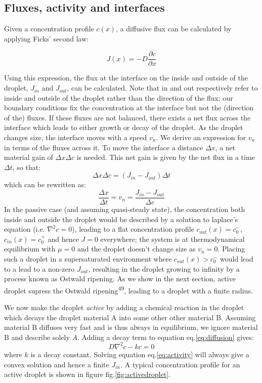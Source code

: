 \documentclass{Dissertate}
\begin{document}
\hypertarget{fluxes-activity-and-interfaces}{%
\subsection{Fluxes, activity and
interfaces}\label{fluxes-activity-and-interfaces}}

Given a concentration profile \(c(x)\), a diffusive flux can be
calculated by applying Ficks' second law:

\[
J(x) = -D\frac{\partial c}{\partial x}
\]

Using this expression, the flux at the interface on the inside and
outside of the droplet, \(J_{in}\) and \(J_{out}\), can be calculated.
Note that in and out respectively refer to inside and outside of the
droplet rather than the direction of the flux; our boundary conditions
fix the concentration at the interface but not the (direction of the)
fluxes. If these fluxes are not balanced, there exists a net flux across
the interface which leads to either growth or decay of the droplet. As
the droplet changes size, the interface moves with a speed \(v_n\). We
derive an expression for \(v_n\) in terms of the fluxes across it. To
move the interface a distance \(\Delta x\), a net material gain of
\(\Delta x \Delta c\) is needed. This net gain is given by the net flux
in a time \(\Delta t\), so that: \[
\Delta x \Delta c = (J_{in}-J_{out})\Delta t
\] which can be rewritten as: \begin{equation}
\frac{\Delta x}{\Delta t} = v_n = \frac{J_{in}-J_{out}}{\Delta c}
\label{eq:interfacespeed}\end{equation} In the passive case (and
assuming quasi-steady state), the concentration both inside and outside
the droplet would be described by a solution to laplace's equation (i.e.
\(\nabla^2c=0\)), leading to a flat concentration profile
\(c_{out}(x)=c_0^-\), \(c_{in}(x)=c_0^+\) and hence \(J=0\) everywhere;
the system is at thermodynamical equilibrium with \(\mu=0\) and the
droplet doesn't change size as \(v_n=0\). Placing such a droplet in a
supersaturated environment where \(c_{out}(x)>c_0^-\) would lead to a
lead to a non-zero \(J_{out}\), resulting in the droplet growing to
infinity by a process known as Ostwald ripening. As we show in the next
section, active droplet supress the Ostwald
ripening\textsuperscript{49}, leading to a droplet with a finite radius.

We now make the droplet \emph{active} by adding a chemical reaction in
the droplet which decays the droplet material A into some other other
material B. Assuming material B diffuses very fast and is thus always in
equilibrium, we ignore material B and describe solely \(A\). Adding a
decay term to equation eq.\ref{eq:diffusion} gives: \begin{equation}
D\nabla^2c-kc=0
\label{eq:activity}\end{equation} where \(k\) is a decay constant.
Solving equation eq.\ref{eq:activity} will always give a convex
solution and hence a finite \(J_{in}\). A typical concentration profile
for an active droplet is shown in figure fig.\ref{fig:activedroplet}.
\end{document}
